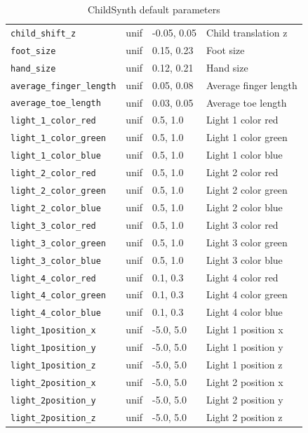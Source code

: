 \documentclass{article}
\begin{document}
\begin{table}[h]
{\begin{tabular}{|l|l|l|l|}
    \texttt{child\_shift\_z} & unif & -0.05, 0.05 & Child translation z\\
    \texttt{foot\_size} & unif & 0.15, 0.23 & Foot size\\
    \texttt{hand\_size} & unif & 0.12, 0.21 & Hand size\\
    \texttt{average\_finger\_length} & unif & 0.05, 0.08 & Average finger length\\
    \texttt{average\_toe\_length} & unif & 0.03, 0.05 & Average toe length\\
    \texttt{light\_1\_color\_red} & unif & 0.5, 1.0 & Light 1 color red\\
    \texttt{light\_1\_color\_green} & unif & 0.5, 1.0 & Light 1 color green\\
    \texttt{light\_1\_color\_blue} & unif & 0.5, 1.0 & Light 1 color blue\\
    \texttt{light\_2\_color\_red} & unif & 0.5, 1.0 & Light 2 color red\\
    \texttt{light\_2\_color\_green} & unif & 0.5, 1.0 & Light 2 color green\\
    \texttt{light\_2\_color\_blue} & unif & 0.5, 1.0 & Light 2 color blue\\
    \texttt{light\_3\_color\_red} & unif & 0.5, 1.0 & Light 3 color red\\
    \texttt{light\_3\_color\_green} & unif & 0.5, 1.0 & Light 3 color green\\
    \texttt{light\_3\_color\_blue} & unif & 0.5, 1.0 & Light 3 color blue\\
    \texttt{light\_4\_color\_red} & unif & 0.1, 0.3 & Light 4 color red\\
    \texttt{light\_4\_color\_green} & unif & 0.1, 0.3 & Light 4 color green\\
    \texttt{light\_4\_color\_blue} & unif & 0.1, 0.3 & Light 4 color blue\\
    \texttt{light\_1position\_x} & unif & -5.0, 5.0 & Light 1 position x\\
    \texttt{light\_1position\_y} & unif & -5.0, 5.0 & Light 1 position y\\
    \texttt{light\_1position\_z} & unif & -5.0, 5.0 & Light 1 position z\\
    \texttt{light\_2position\_x} & unif & -5.0, 5.0 & Light 2 position x\\
    \texttt{light\_2position\_y} & unif & -5.0, 5.0 & Light 2 position y\\
    \texttt{light\_2position\_z} & unif & -5.0, 5.0 & Light 2 position z\\

    \hline
    \end{tabular}
    }
    \caption{ChildSynth default parameters}
    \label{table:defaults}
    \end{table}




\end{document}
